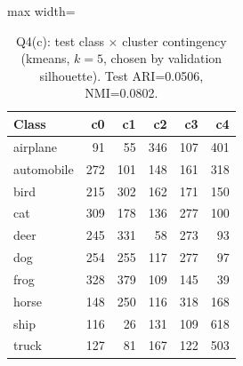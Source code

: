 \begin{table}[t]\centering\footnotesize\setlength{\tabcolsep}{3pt}
\begin{adjustbox}{max width=\textwidth}
\begin{tabular}{lrrrrr}\toprule
Class & c0 & c1 & c2 & c3 & c4 \\\midrule
airplane & 91 & 55 & 346 & 107 & 401 \\
automobile & 272 & 101 & 148 & 161 & 318 \\
bird & 215 & 302 & 162 & 171 & 150 \\
cat & 309 & 178 & 136 & 277 & 100 \\
deer & 245 & 331 & 58 & 273 & 93 \\
dog & 254 & 255 & 117 & 277 & 97 \\
frog & 328 & 379 & 109 & 145 & 39 \\
horse & 148 & 250 & 116 & 318 & 168 \\
ship & 116 & 26 & 131 & 109 & 618 \\
truck & 127 & 81 & 167 & 122 & 503 \\
\bottomrule\end{tabular}
\end{adjustbox}
\caption{Q4(c): test class $\times$ cluster contingency (kmeans, $k=5$, chosen by validation silhouette). Test ARI=0.0506, NMI=0.0802.}\label{tab:q4c}\end{table}
